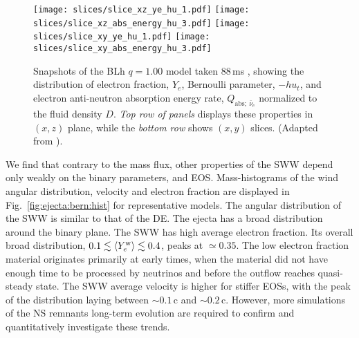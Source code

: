 \begin{figure*}[t]
    \centering 
    \texttt{[image: slices/slice\_xz\_ye\_hu\_1.pdf]}
    \texttt{[image: slices/slice\_xz\_abs\_energy\_hu\_3.pdf]}
    \texttt{[image: slices/slice\_xy\_ye\_hu\_1.pdf]}
    \texttt{[image: slices/slice\_xy\_abs\_energy\_hu\_3.pdf]}
    \caption{
        Snapshots of the BLh $q=1.00$ model taken $88\,$ms \pmerg{}, 
        showing the distribution of electron fraction, $Y_e$, 
        Bernoulli parameter, $-hu_t$, and electron anti-neutron 
        absorption energy rate, $Q_{\text{abs};\:\bar{\nu}_e}$ 
        normalized to the fluid density $D$. 
        \textit{Top row of panels} displays these properties in $(x,z)$ plane, 
        while the \textit{bottom row} shows $(x,y)$ slices. 
        (Adapted from \citet{Nedora:2020pak}).
    }
    \label{fig:slice:heating_hu}
\end{figure*}

We find that contrary to the mass flux, other properties of the \ac{SWW} 
depend only weakly on the binary parameters,
\mr{} and \ac{EOS}. Mass-histograms of the wind angular distribution, velocity and 
electron fraction are displayed in Fig.~\ref{fig:ejecta:bern:hist} for representative models. 
The angular distribution of the \ac{SWW} is similar to that of the \ac{DE}. The ejecta 
has a broad distribution around the binary plane.
The \ac{SWW} has high average electron fraction. Its overall broad distribution,  
$0.1\lesssim \langle Y^{\text{w}}_{e}\rangle\lesssim0.4$, peaks at ${\simeq}0.35$.
The low electron fraction material originates primarily at early times, when the 
material did not have enough time to be processed by neutrinos and before the 
outflow reaches quasi-steady state.
The \ac{SWW} average velocity is higher for stiffer \acp{EOS}, with the peak 
of the distribution laying between ${\sim}0.1\,$c and ${\sim}0.2\,$c.
However, more simulations of the \ac{NS} remnants long-term evolution are 
required to confirm and quantitatively investigate these trends.

